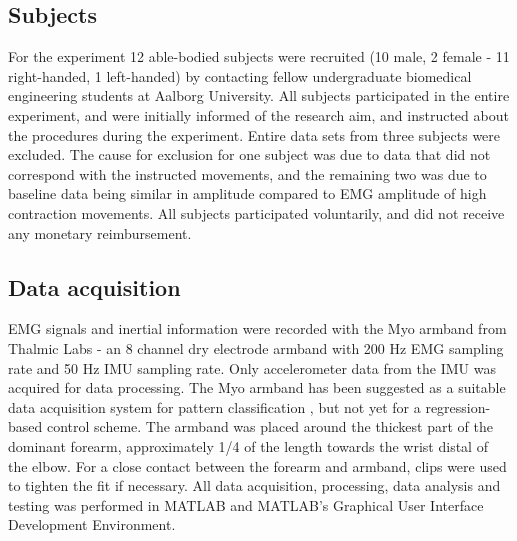 \subsection{Subjects}
For the experiment 12 able-bodied subjects were recruited (10 male, 2 female - 11 right-handed, 1 left-handed) by contacting fellow undergraduate biomedical engineering students at Aalborg University. All subjects participated in the entire experiment, and were initially informed of the research aim, and instructed about the procedures during the experiment. Entire data sets from three subjects were excluded. The cause for exclusion for one subject was due to data that did not correspond with the instructed movements, and the remaining two was due to baseline data being similar in amplitude compared to EMG amplitude of high contraction movements. All subjects participated voluntarily, and did not receive any monetary reimbursement. 

\subsection{Data acquisition}
EMG signals and inertial information were recorded with the Myo armband from Thalmic Labs - an 8 channel dry electrode armband with 200 Hz EMG sampling rate and 50 Hz IMU sampling rate. Only accelerometer data from the IMU was acquired for data processing. The Myo armband has been suggested as a suitable data acquisition system for pattern classification \cite{Mendez2017}, but not yet for a regression-based control scheme. 
The armband was placed around the thickest part of the dominant forearm, approximately 1/4 of the length towards the wrist distal of the elbow. For a close contact between the forearm and armband, clips were used to tighten the fit if necessary. All data acquisition, processing, data analysis and testing was performed in MATLAB and MATLAB's Graphical User Interface Development Environment.

